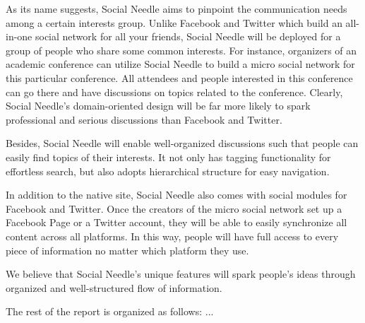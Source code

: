 As its name suggests, Social Needle aims to pinpoint the communication needs among a certain interests group. Unlike Facebook and Twitter which build an all-in-one social network for all your friends, Social Needle will be deployed for a group of people who share some common interests. For instance, organizers of an academic conference can utilize Social Needle to build a micro social network for this particular conference. All attendees and people interested in this conference can go there and have discussions on topics related to the conference. Clearly, Social Needle's domain-oriented design will be far more likely to spark professional and serious discussions than Facebook and Twitter. 

Besides, Social Needle will enable well-organized discussions such that people can easily find topics of their interests. It not only has tagging functionality for effortless search, but also adopts hierarchical structure for easy navigation. 

In addition to the native site, Social Needle also comes with social modules for Facebook and Twitter. Once the creators of the micro social network set up a Facebook Page or a Twitter account, they will be able to easily synchronize all content across all platforms. In this way, people will have full access to every piece of information no matter which platform they use. 

We believe that Social Needle's unique features will spark people's ideas through organized and well-structured flow of information. 

The rest of the report is organized as follows: ...